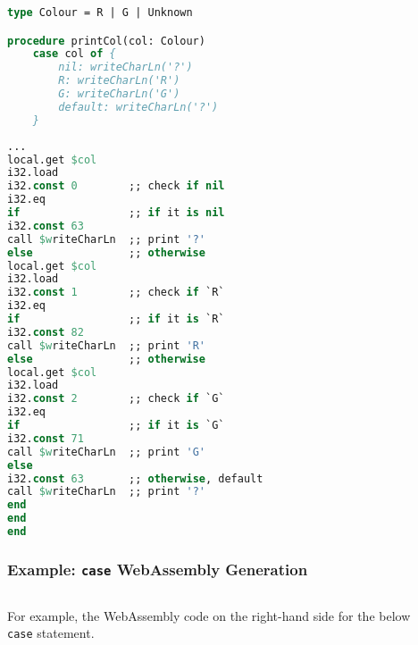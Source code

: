 \documentclass{beamer}
\begin{document}
\begin{lrbox}{\caseGenCode}
\begin{lstlisting}[language=Pascal,basicstyle=\tiny]
type Colour = R | G | Unknown

procedure printCol(col: Colour)
    case col of {
        nil: writeCharLn('?')
        R: writeCharLn('R')
        G: writeCharLn('G')
        default: writeCharLn('?')
    }

\end{lstlisting}
\end{lrbox}


\begin{lrbox}{\caseGenWat}
\begin{lstlisting}[language=Pascal,basicstyle=\tiny]
...
local.get $col
i32.load
i32.const 0        ;; check if nil
i32.eq
if                 ;; if it is nil
i32.const 63
call $writeCharLn  ;; print '?'
else               ;; otherwise
local.get $col
i32.load
i32.const 1        ;; check if `R`
i32.eq
if                 ;; if it is `R`
i32.const 82
call $writeCharLn  ;; print 'R'
else               ;; otherwise
local.get $col
i32.load
i32.const 2        ;; check if `G`
i32.eq
if                 ;; if it is `G`
i32.const 71
call $writeCharLn  ;; print 'G'
else
i32.const 63       ;; otherwise, default
call $writeCharLn  ;; print '?'
end
end
end
\end{lstlisting}
\end{lrbox}


\begin{frame}
 \frametitle{Example: \texttt{case} WebAssembly Generation}
    \begin{columns}[T,onlytextwidth]
        \begin{column}{.40\textwidth}
            \begin{minipage}{\textwidth}
                {\footnotesize For example, the WebAssembly code on the right-hand side for the below \texttt{case} statement.}
                \ \\ \ \\ \ \\
                \usebox{\caseGenCode}
            \end{minipage}
        \end{column}
        \begin{column}{.50\textwidth}
            \begin{minipage}{\textwidth}
                \usebox{\caseGenWat}
            \end{minipage}
        \end{column}
    \end{columns}
\end{frame}
\end{document}
